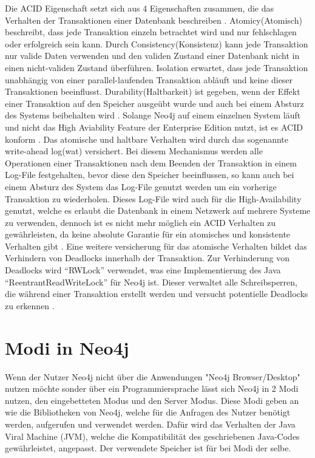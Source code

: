 Die ACID Eigenschaft setzt sich aus 4 Eigenschaften zusammen, die das Verhalten der Transaktionen einer  Datenbank beschreiben \parencite{haerder1983principles}. Atomicy(Atomisch) beschreibt, dass jede Transaktion einzeln betrachtet wird und nur fehlschlagen oder erfolgreich sein kann. Durch Consistency(Konsistenz) kann jede Transaktion nur valide Daten verwenden und den validen Zustand einer Datenbank nicht in einen nicht-validen Zustand überführen. Isolation erwartet, dass jede Transaktion unabhängig von einer parallel-laufenden Transaktion abläuft und keine dieser Transaktionen beeinflusst. Durability(Haltbarkeit) ist gegeben, wenn der Effekt einer Transaktion auf den Speicher ausgeübt wurde und auch bei einem Absturz des Systems beibehalten wird \parencite{haerder1983principles}. Solange Neo4j auf einem einzelnen System läuft und nicht das High Aviability Feature der Enterprise Edition nutzt, ist es ACID konform \parencite{holzschuher2013performance}. Das atomische und haltbare Verhalten wird durch das sogenannte write-ahead log(wat) versichert. Bei diesem Mechanismus  werden alle Operationen einer Transaktionen nach dem Beenden der Transaktion in einem Log-File  festgehalten, bevor diese  den Speicher beeinflussen, so kann auch bei einem Absturz des System das Log-File genutzt werden um ein vorherige Transaktion zu wiederholen.  Dieses Log-File wird auch für die High-Availability  genutzt, welche es erlaubt die Datenbank in einem Netzwerk auf mehrere Systeme zu verwenden, dennoch ist es nicht mehr möglich ein  ACID Verhalten zu gewährleisten, da keine absolute Garantie für ein  atomisches und konsistente Verhalten gibt \parencite{vukotic2015neo4j}. Eine weitere versicherung für das atomische Verhalten bildet das Verhindern von Deadlocks innerhalb der Transaktion. Zur Verhinderung von Deadlocks wird “RWLock” verwendet, was eine Implementierung des Java “ReentrantReadWriteLock” für Neo4j ist. Dieser verwaltet alle Schreibsperren, die während einer Transaktion erstellt werden und versucht potentielle Deadlocks zu erkennen \parencite{raj2015neo4j}.
\section {Modi in Neo4j}
Wenn der Nutzer Neo4j nicht über die Anwendungen "Neo4j Browser/Desktop" nutzen möchte sonder über ein Programmiersprache  lässt sich Neo4j in 2 Modi nutzen, den eingebetteten Modus und den Server Modus. Diese Modi geben an wie die Bibliotheken von Neo4j, welche für die Anfragen des Nutzer benötigt werden, aufgerufen und verwendet werden. Dafür wird das Verhalten der Java Viral Machine (JVM), welche die Kompatibilität des geschriebenen Java-Codes gewährleistet, angepasst. Der verwendete Speicher ist für bei Modi der selbe.


